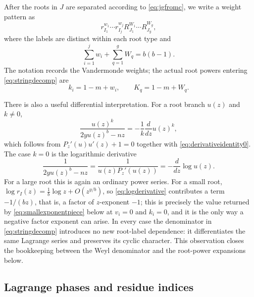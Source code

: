 \documentclass[11pt]{amsart}
\theoremstyle{remark}
\begin{document}
After the roots in $J$ are separated according to \eqref{eq:jgfromc}, we write a weight pattern as
\begin{equation}\label{eq:string}
    r_{I_1}^{w_1}\cdots r_{I_j}^{w_j}
    R_{J_1}^{W_1}\cdots R_{J_g}^{W_g},
\end{equation}
where the labels are distinct within each root type and
\begin{equation}\label{eq:weightsum2}
    \sum_{i=1}^{j}w_i+\sum_{q=1}^{g}W_q=b(b-1).
\end{equation}
The notation records the Vandermonde weights; the actual root powers entering \eqref{eq:stringdecomp} are
\begin{equation}\label{eq:kweights}
    k_i=1-m+w_i,
    \qquad
    K_q=1-m+W_q.
\end{equation}

There is also a useful differential interpretation.  For a root branch $u(z)$ and $k\neq0$,
\begin{equation}\label{eq:derivativeidentity}
    \frac{u(z)^k}{2yu(z)^b-nz}
    =-\frac1k\frac{d}{dz}u(z)^k,
\end{equation}
which follows from $P_z'(u)u'(z)+1=0$ together with \eqref{eq:derivativeidentity0}.  The case $k=0$ is the logarithmic derivative
\begin{equation}\label{eq:logderivative}
    \frac{1}{2yu(z)^b-nz}
    =\frac{1}{u(z)P_z'(u(z))}
    =-\frac{d}{dz}\log u(z).
\end{equation}
For a large root this is again an ordinary power series.  For a small root, $\log r_I(z)=\tfrac1b\log z+O(z^{y/b})$, so \eqref{eq:logderivative} contributes a term $-1/(bz)$, that is, a factor of $z$-exponent $-1$; this is precisely the value returned by \eqref{eq:smallexponentpiece} below at $v_i=0$ and $k_i=0$, and it is the only way a negative factor exponent can arise.  In every case the denominator in \eqref{eq:stringdecomp} introduces no new root-label dependence: it differentiates the same Lagrange series and preserves its cyclic character.  This observation closes the bookkeeping between the Weyl denominator and the root-power expansions below.

\subsection{Lagrange phases and residue indices}\label{subsec:lagrangephases}
\end{document}
